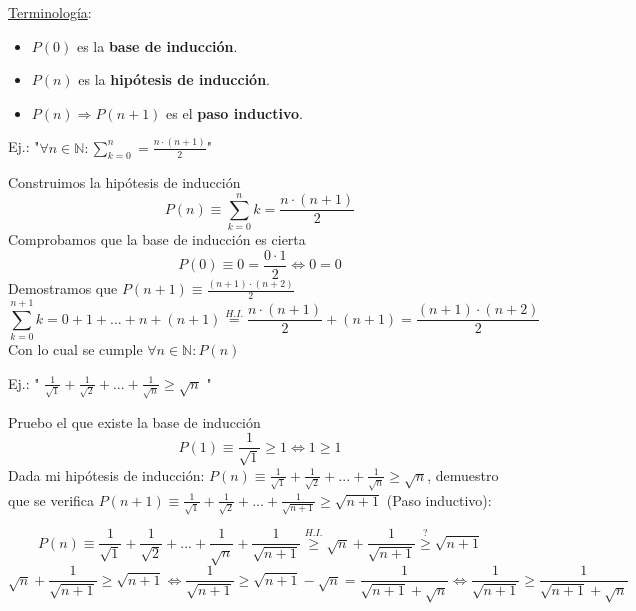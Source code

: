 \documentclass[10pt,a4paper,openright]{book}
\begin{document}
\underline{Terminología}:
\begin{itemize}
\item $P(0)$ es la \textbf{base de inducción}.
\item $P(n)$ es la \textbf{hipótesis de inducción}.
\item $P(n)\Rightarrow P(n+1)$ es el \textbf{paso inductivo}.
\end{itemize}
\vspace{1cm}
Ej.: "$\forall n \in \mathbb N : \sum_{k=0}^{n}=\frac{n\cdot(n+1)}{2}$"\par
Construimos la hipótesis de inducción
$$P(n)\equiv \sum_{k=0}^{n}k=\frac{n\cdot(n+1)}{2}$$
Comprobamos que la base de inducción es cierta
$$P(0)\equiv 0=\frac{0\cdot 1}{2}\Leftrightarrow 0=0$$
Demostramos que $P(n+1)\equiv \frac{(n+1)\cdot (n+2)}{2}$
$$\sum_{k=0}^{n+1}k=0+1+...+n+(n+1)\stackrel{H.I.}=\frac{n\cdot (n+1)}{2}+(n+1)=\frac{(n+1)\cdot (n+2)}{2}$$
Con lo cual se cumple $\forall n\in \mathbb N: P(n)$\par
\vspace{0.5cm}
Ej.: " $\frac{1}{\sqrt{1}}+\frac{1}{\sqrt{2}}+...+\frac{1}{\sqrt{n}} \geq \sqrt{n}$ "\par
Pruebo el que existe la base de inducción
$$P(1)\equiv \frac{1}{\sqrt{1}}\geq 1 \Leftrightarrow 1 \geq 1$$
Dada mi hipótesis de inducción: $P(n)\equiv \frac{1}{\sqrt{1}}+\frac{1}{\sqrt{2}}+...+\frac{1}{\sqrt{n}} \geq \sqrt{n}$, demuestro que se verifica $P(n+1)\equiv \frac{1}{\sqrt{1}}+\frac{1}{\sqrt{2}}+...+\frac{1}{\sqrt{n+1}} \geq \sqrt{n+1}$ (Paso inductivo):

$$P(n)\equiv \frac{1}{\sqrt{1}}+\frac{1}{\sqrt{2}}+...+\frac{1}{\sqrt{n}}+ \frac{1}{\sqrt{n+1}}\stackrel{H.I.}{\geq} \sqrt{n}+\frac{1}{\sqrt{n+1}} \stackrel{?}{\geq} \sqrt{n+1}$$
$$\sqrt{n}+\frac{1}{\sqrt{n+1}} \geq \sqrt{n+1} \Leftrightarrow \frac{1}{\sqrt{n+1}} \geq \sqrt{n+1}-\sqrt{n} = \frac{1}{\sqrt{n+1}+\sqrt{n}}\Leftrightarrow \frac{1}{\sqrt{n+1}} \geq \frac{1}{\sqrt{n+1}+\sqrt{n}}$$
\end{document}

